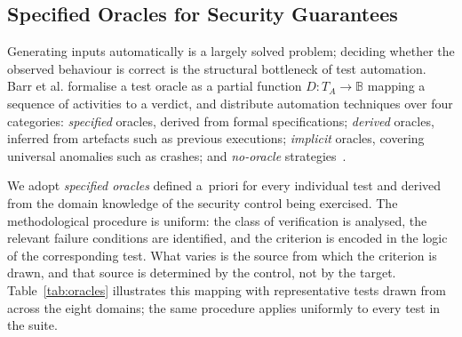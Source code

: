 \documentclass[
]{ceurart}
\begin{document}
\subsection{Specified Oracles for Security Guarantees}
\label{sec:oracles}

Generating inputs automatically is a largely solved problem; deciding whether the observed behaviour is correct is the structural bottleneck of test automation.
Barr et al. formalise a test oracle as a partial function $D: T_A \to \mathbb{B}$ mapping a sequence of activities to a verdict, and distribute automation techniques over four categories: \emph{specified} oracles, derived from formal specifications; \emph{derived} oracles, inferred from artefacts such as previous executions; \emph{implicit} oracles, covering universal anomalies such as crashes; and \emph{no-oracle} strategies~\cite{barrOracleProblemSoftware2015}.

We adopt \emph{specified oracles} defined a~priori for every individual test and derived from the domain knowledge of the security control being exercised.
The methodological procedure is uniform: the class of verification is analysed, the relevant failure conditions are identified, and the criterion is encoded in the logic of the corresponding test.
What varies is the source from which the criterion is drawn, and that source is determined by the control, not by the target.
Table~\ref{tab:oracles} illustrates this mapping with representative tests drawn from across the eight domains; the same procedure applies uniformly to every test in the suite.
\end{document}
